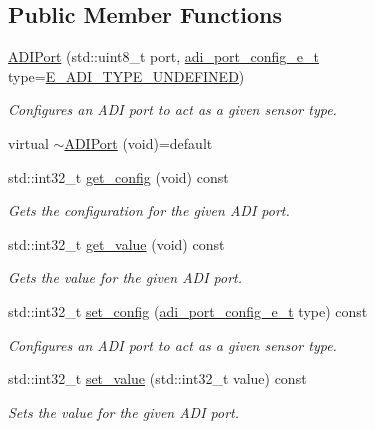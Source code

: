 \subsection*{Public Member Functions}
\begin{DoxyCompactItemize}
\item 
\hyperlink{classpros_1_1ADIPort_ab6ef7710de366895859d770ffb1d8cf1}{A\+D\+I\+Port} (std\+::uint8\+\_\+t port, \hyperlink{adi_8h_a4efff81399e823764aa05cd5c172ea55}{adi\+\_\+port\+\_\+config\+\_\+e\+\_\+t} type=\hyperlink{adi_8h_ad5f9ddf0fd9de73c4b23fa5485144b7fa37e9d6ebc03d88c58db1904a7f2b7373}{E\+\_\+\+A\+D\+I\+\_\+\+T\+Y\+P\+E\+\_\+\+U\+N\+D\+E\+F\+I\+N\+ED})
\begin{DoxyCompactList}\small\item\em Configures an A\+DI port to act as a given sensor type. \end{DoxyCompactList}\item 
virtual \hyperlink{classpros_1_1ADIPort_ae6a3753c05e008992e6eff5e8c927e46}{$\sim$\+A\+D\+I\+Port} (void)=default
\item 
std\+::int32\+\_\+t \hyperlink{classpros_1_1ADIPort_a1227bc815b12d2789cb78f6d3dcaf37b}{get\+\_\+config} (void) const
\begin{DoxyCompactList}\small\item\em Gets the configuration for the given A\+DI port. \end{DoxyCompactList}\item 
std\+::int32\+\_\+t \hyperlink{classpros_1_1ADIPort_ac79b5fd3ce67ae6ffc4b1fbbb306e997}{get\+\_\+value} (void) const
\begin{DoxyCompactList}\small\item\em Gets the value for the given A\+DI port. \end{DoxyCompactList}\item 
std\+::int32\+\_\+t \hyperlink{classpros_1_1ADIPort_abd86653eebbc34b863ace81839f7e40c}{set\+\_\+config} (\hyperlink{adi_8h_a4efff81399e823764aa05cd5c172ea55}{adi\+\_\+port\+\_\+config\+\_\+e\+\_\+t} type) const
\begin{DoxyCompactList}\small\item\em Configures an A\+DI port to act as a given sensor type. \end{DoxyCompactList}\item 
std\+::int32\+\_\+t \hyperlink{classpros_1_1ADIPort_ae6711117fbceb3bb6e3602c4ef63aff1}{set\+\_\+value} (std\+::int32\+\_\+t value) const
\begin{DoxyCompactList}\small\item\em Sets the value for the given A\+DI port. \end{DoxyCompactList}\end{DoxyCompactItemize}



